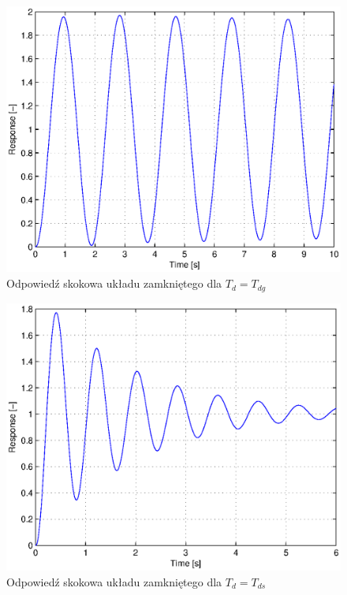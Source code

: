 \documentclass[12pt]{article}
\begin{document}
\begin{figure}[!htb]
	\begin{center}
		\includegraphics[width=12cm]{../res/img/2-1-0,55_resp.eps} 
	\end{center}
	\caption{Odpowiedź skokowa układu zamkniętego dla $T_{d}=T_{dg}$}
\end{figure}

\begin{figure}[!htb]
	\begin{center}
		\includegraphics[width=12cm]{../res/img/2-1-3_resp.eps} 
	\end{center}
	\caption{Odpowiedź skokowa układu zamkniętego dla $T_{d}=T_{ds}$}
\end{figure}
\end{document}
